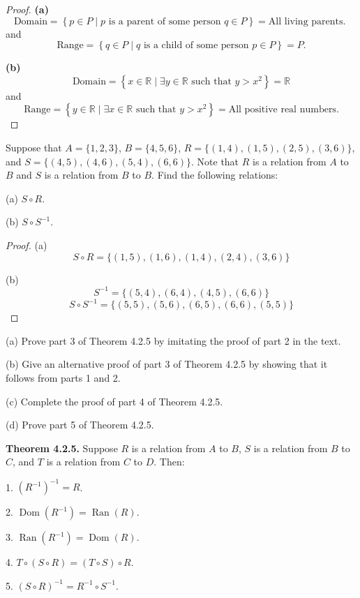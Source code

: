 \documentclass[12pt]{article}
\newenvironment{exercise}[2][Exercise]{\begin{trivlist}
\item[\hskip \labelsep {\bfseries #1}\hskip \labelsep {\bfseries #2.}]}{\end{trivlist}}
\newenvironment{aw}
  {\begin{adjustwidth}{2em}{0em}}
  {\end{adjustwidth}}
\begin{document}
\begin{proof}
	\textbf{(a)}\[
		\text{Domain} = \left\{ p \in P \mid p \text{ is a parent of some person } q \in P \right\} = \text{All living parents. } 
	\]
	and
	\[
		\text{Range} = \left\{ q \in P \mid q \text{ is a child of some person } p \in P \right\} = P.
	\]

	\textbf{(b)} \\
	\[
		\text{Domain} = \left\{ x \in \mathbb{R} \mid \exists y \in \mathbb{R} \text{ such that } y > x^2 \right\} = \mathbb{R}
	\]
	and
	\[
		\text{Range} = \left\{ y \in \mathbb{R} \mid \exists x \in \mathbb{R} \text{ such that } y > x^2 \right\}=\text{All positive real numbers} .
	\]
\end{proof}

\begin{exercise}
	{5}
	Suppose that \( A = \{1, 2, 3\} \), \( B = \{4, 5, 6\} \), \( R = \{(1, 4), (1, 5), (2, 5), (3, 6)\} \), and \( S = \{(4, 5), (4, 6), (5, 4), (6, 6)\} \). Note that \( R \) is a relation from \( A \) to
\( B \) and \( S \) is a relation from \( B \) to \( B \). Find the following relations:

(a) \( S \circ R \).

(b) \( S \circ S^{-1} \).

\end{exercise}

\begin{proof}
	(a) \[ S\circ R=\{ (1,5), (1,6), (1,4), (2,4), (3,6) \} \]
	
	(b) 
	\[
		S^{-1} = \{(5,4),(6,4),(4,5),(6,6)\} 
	\]
	\[
		S\circ S^{-1} = \{(5,5), (5,6), (6,5), (6,6), (5,5)\}
	\]
\end{proof}

\begin{exercise}
	{7}
	(a) Prove part 3 of Theorem 4.2.5 by imitating the proof of part 2 in the text.

	(b) Give an alternative proof of part 3 of Theorem 4.2.5 by showing that it follows from parts 1 and 2.

	(c) Complete the proof of part 4 of Theorem 4.2.5.

	(d) Prove part 5 of Theorem 4.2.5.

	\begin{aw}
	\textbf{Theorem 4.2.5.} Suppose \( R \) is a relation from \( A \) to \( B \), \( S \) is a relation from \( B \) to \( C \), and \( T \) is a relation from \( C \) to \( D \). Then:

	1. \( (R^{-1})^{-1} = R \).

	2. \( \operatorname{Dom}(R^{-1}) = \operatorname{Ran}(R) \).

	3. \( \operatorname{Ran}(R^{-1}) = \operatorname{Dom}(R) \).

	4. \( T \circ (S \circ R) = (T \circ S) \circ R \).

	5. \( (S \circ R)^{-1} = R^{-1} \circ S^{-1} \).
	\end{aw}
\end{exercise}
\end{document}

